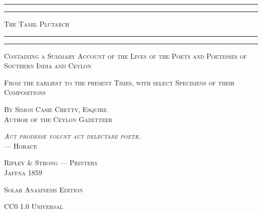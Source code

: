 \documentclass{article}
\begin{document}
\begin{titlepage} %
	\centering %


	\rule{\textwidth}{1.6pt}\vspace*{-\baselineskip}\vspace*{2pt} %
	\rule{\textwidth}{0.4pt} %
	
	\vspace{1\baselineskip} %
	
	{\scshape\Huge The Tamil Plutarch}
	
	\vspace{1\baselineskip} %

	\rule{\textwidth}{0.4pt}\vspace*{-\baselineskip}\vspace{3.2pt} %
	\rule{\textwidth}{1.6pt} %
	
	\vspace{1\baselineskip} %
	
	

    {\scshape\small Containing a Summary Account of the Lives of the Poets and Poetesses of Southern India and Ceylon} 

    \vspace{0.5\baselineskip}
    
    {\scshape\footnotesize From the earliest to the present Times, with select Specimens of their Compositions} 

    \vspace{1.0\baselineskip}

    {\scshape\small By \large Simon Casie Chetty, \small Esquire\\Author of the Ceylon Gazetteer}
    
    \vspace{2.0\baselineskip}
        
    {\scshape\small \emph{Aut prodesse volunt aut delectare poetæ.}\\ --- Horace} %


    \vspace*{\fill}

	\vspace{1\baselineskip}

    {\scshape\small Ripley \& Strong --- Printers\\ Jaffna 1859}
		
	\vspace{0.25\baselineskip} %

    {\scshape\small Solar Anamnesis Edition}%

	{\scshape\footnotesize CC0 1.0 Universal} %
\end{titlepage}
\clearpage
\tableofcontents
\clearpage
\end{document}
